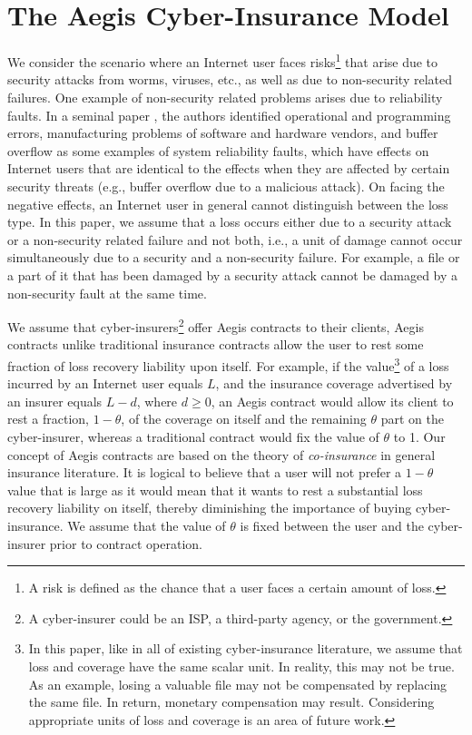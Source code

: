 \documentclass[letterpaper,12pt, onecolumn, nodraft]{IEEEtran}
\begin{document}
\begin{enumerate}
\end{enumerate}

 \section{The Aegis Cyber-Insurance Model} \label{sec-model}
We consider the scenario where an Internet user faces risks\footnote{A risk is defined as the chance that a user faces a certain amount of loss.}  that arise due to security attacks from worms, viruses, etc., as well as due to non-security related failures. One example of non-security related problems arises due to reliability faults. In a seminal paper \cite{hs-security}, the authors identified operational and programming errors, manufacturing problems of software and hardware vendors, and buffer overflow as some examples of system reliability faults, which have effects on Internet users that are identical to the effects when they are affected by certain security threats (e.g., buffer overflow due to a malicious attack). On facing the negative effects, an Internet user in general cannot distinguish between the loss type. In this paper, we assume that a loss occurs either due to a security attack or a non-security related failure and not both, i.e., a unit of damage cannot occur simultaneously due to a security and a non-security failure. For example, a file or a part of it that has been damaged by a security attack cannot be damaged by a non-security fault at the same time.

We assume that cyber-insurers\footnote{A cyber-insurer could be an ISP, a third-party agency, or the government.} offer Aegis contracts to their clients, Aegis contracts unlike traditional insurance contracts allow the user to rest some fraction of loss recovery liability upon itself. For example, if the value\footnote{In this paper, like in all of existing cyber-insurance literature, we assume that loss and coverage have the same scalar unit. In reality, this may not be true. As an example, losing a valuable file may not be compensated by replacing the same file. In return, monetary compensation may result. Considering appropriate units of loss and coverage is an area of future work. } of a loss incurred by an Internet user equals $L$, and the insurance coverage advertised by an insurer equals $L - d$, where $d\ge0$, an Aegis contract would allow its client to rest a fraction, $1 - \theta$, of the coverage on itself and the remaining $\theta$ part on the cyber-insurer, whereas a traditional contract would fix the value of $\theta$ to 1. 
Our concept of Aegis contracts are based on the theory of \emph{co-insurance} in general insurance literature. It is logical to believe that a user will not prefer a $1 -\theta$ value that is large as it would mean that it wants to rest a substantial loss recovery liability on itself, thereby diminishing the importance of buying cyber-insurance. We assume that the value of $\theta$ is fixed between the user and the cyber-insurer prior to contract operation.
\end{document}
